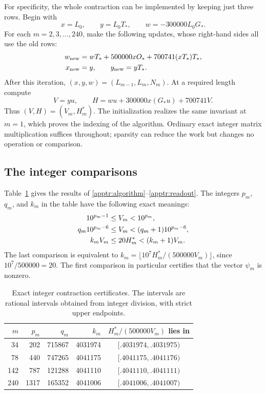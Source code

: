 \documentclass[11pt]{article}
\theoremstyle{remark}
\numberwithin{equation}{section}
\begin{document}
For specificity, the whole contraction can be implemented by keeping
just three rows.  Begin with
\[
 x=L_0,\qquad y=L_0T_*,\qquad w=-300000L_0G_*.
\]
For each $m=2,3,\ldots,240$, make the following updates, whose
right-hand sides all use the old rows:
\begin{align}
 w_{\mathrm{new}}&=wT_*+500000xO_*+700741(xT_*)T_*,\notag\\
 x_{\mathrm{new}}&=y,\qquad y_{\mathrm{new}}=yT_*.
 \label{apptr:algorithm}
\end{align}
After this iteration, $(x,y,w)=(L_{m-1},L_m,N_m)$.
At a required length compute
\begin{equation}\label{apptr:readout}
 V=yu,\qquad H=wu+300000x(G_*u)+700741V.
\end{equation}
Thus $(V,H)=(V_m,H_m^*)$.  The initialization realizes the same
invariant at $m=1$, which proves the indexing of the algorithm.
Ordinary exact integer matrix multiplication suffices throughout;
sparsity can reduce the work but changes no operation or comparison.

\subsection{The integer comparisons}

Table~\ref{apptr:certificate-table} gives the results of
\eqref{apptr:algorithm}--\eqref{apptr:readout}.  The integers $p_m$,
$q_m$, and $k_m$ in the table have the following exact meanings:
\begin{align}
 10^{p_m-1}&\le V_m<10^{p_m},\notag\\
 q_m10^{p_m-6}&\le V_m<(q_m+1)10^{p_m-6},\notag\\
 k_mV_m&\le20H_m^*<(k_m+1)V_m.
 \label{apptr:certificate-inequalities}
\end{align}
The last comparison is equivalent to
$k_m=\lfloor10^7H_m^*/(500000V_m)\rfloor$, since
$10^7/500000=20$.  The first comparison in particular certifies
that the vector $\psi_m$ is nonzero.

\begin{table}[htbp]

\begin{tabular}{r|r|r|r|c}
 $m$&$p_m$&$q_m$&$k_m$&
 $H_m^*/(500000V_m)$ lies in\\ \hline
 34&202&715867&4031974&$[.4031974,.4031975)$\\
 78&440&747265&4041175&$[.4041175,.4041176)$\\
 142&787&121288&4041110&$[.4041110,.4041111)$\\
 240&1317&165352&4041006&$[.4041006,.4041007)$
\end{tabular}
\caption{Exact integer contraction certificates.  The intervals
are rational intervals obtained from integer division, with strict
upper endpoints.}
\label{apptr:certificate-table}
\end{table}
\end{document}

